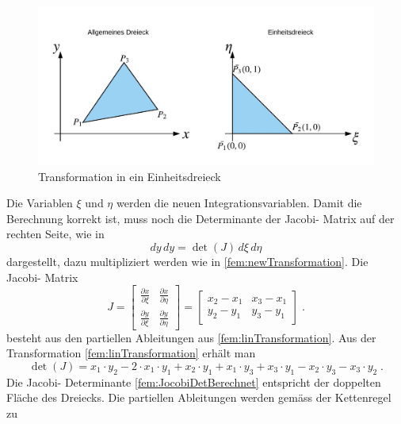 \begin{figure}[h!]
	\centering
	\includegraphics[scale=0.8]{papers/fem/Images/Dreiecke.jpeg}
	\caption{Transformation in ein Einheitsdreieck}
	\label{fig:TransformationEinheitsdreieckBild}
\end{figure}
Die Variablen $\xi$ und $\eta$ werden die neuen Integrationsvariablen. Damit die Berechnung korrekt ist, muss noch die Determinante der Jacobi- Matrix auf der rechten Seite, wie in 
\begin{equation}
			dy \, dy = \det(J) \, d\xi \, d\eta
			\label{fem:newTransformation}
\end{equation}
dargestellt, dazu multipliziert werden wie in \eqref{fem:newTransformation}. Die Jacobi- Matrix
\begin{equation}
J %
=
\begin{bmatrix}
    \frac{\partial x}{\partial \xi} &  \frac{\partial x}{\partial \eta}     \\
   \frac{\partial y}{\partial \xi}  &  \frac{\partial y}{\partial \eta}     
\end{bmatrix}
= 
\begin{bmatrix}
    x_2 - x_1  &  x_3 -x_1      \\
    y_2 - y_1  &  y_3 - y_1      
\end{bmatrix} \; .
	\label{fem:Jocobi}
\end{equation}
besteht aus den partiellen Ableitungen aus \eqref{fem:linTransformation}. Aus der Transformation \eqref{fem:linTransformation} erhält man 
\begin{equation}
	\det(J) = x_1 \cdot y_2 - 2 \cdot x_1 \cdot y_1 + x_2 \cdot y_1 + x_1\cdot y_3 + x_3 \cdot y_1 - x_2 \cdot y_3 - x_3 \cdot y_2 \; .
	\label{fem:JocobiDetBerechnet}
\end{equation}
Die Jacobi- Determinante \eqref{fem:JocobiDetBerechnet} entspricht der doppelten Fläche des Dreiecks. Die partiellen Ableitungen werden gemäss der Kettenregel zu 
